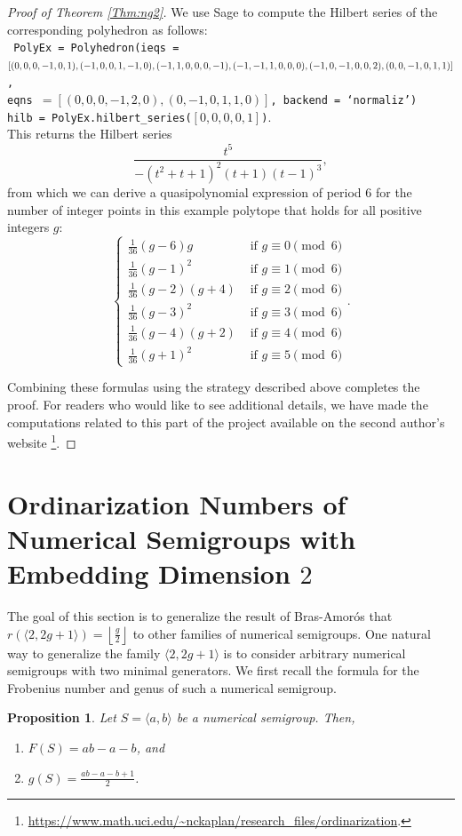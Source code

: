\documentclass[12pt]{amsart}
\theoremstyle{plain}\newtheorem{proposition}{Proposition}[section]
\begin{document}
\begin{proof}[Proof of Theorem \ref{Thm:ng2}]
We use Sage to compute the Hilbert series of the corresponding polyhedron as follows:\\
\texttt{\small{
PolyEx = Polyhedron(ieqs = $[(0,0,0,-1,0,1),(-1,0,0,1,-1,0),(-1,1,0,0,0,-1),\\
(-1,-1,1,0,0,0),(-1,0,-1,0,0,2),(0,0,-1,0,1,1)]$,\\
 eqns $= [(0,0,0,-1,2,0),(0,-1,0,1,1,0)]$, backend = `normaliz')\\
hilb = PolyEx.hilbert\_series($[0,0,0,0,1]$)}}.\\
This returns the Hilbert series 
 \[
\frac{t^5}{-{\left(t^{2} + t + 1\right)}^{2} {\left(t + 1\right)} {\left(t - 1\right)}^{3}},
 \]
from which we can derive a quasipolynomial expression of period $6$ for the number of integer points in this example polytope that holds for all positive integers $g$:
\[
\begin{cases}
\frac{1}{36} (g - 6)  g & \text{ if } g \equiv 0 \pmod{6} \\
\frac{1}{36}  (g - 1)^2  & \text{ if } g \equiv 1 \pmod{6} \\
\frac{1}{36} (g - 2)  (g+4) & \text{ if } g \equiv 2 \pmod{6} \\
\frac{1}{36}  (g - 3)^2  & \text{ if } g \equiv 3 \pmod{6} \\
\frac{1}{36} (g - 4)  (g+2) & \text{ if } g \equiv 4 \pmod{6} \\
\frac{1}{36}  (g + 1)^2  & \text{ if } g \equiv 5 \pmod{6} 
\end{cases}.
\]

Combining these formulas using the strategy described above completes the proof.  For readers who would like to see additional details, we have made the computations related to this part of the project available on the second author's website \footnote{\url{https://www.math.uci.edu/~nckaplan/research\_files/ordinarization}.}.
\end{proof}



\section{Ordinarization Numbers of Numerical Semigroups with Embedding Dimension $2$}\label{sec:ord_e2}

The goal of this section is to generalize the result of Bras-Amor\'os that $r\left(\langle 2,2g+1\rangle\right) = \left\lfloor\frac{g}{2}\right\rfloor$ to other families of numerical semigroups.  One natural way to generalize the family $\langle 2,2g+1\rangle$ is to consider arbitrary numerical semigroups with two minimal generators. We first recall the formula for the Frobenius number and genus of such a numerical semigroup.
\begin{proposition}\cite[Propositon 2.13]{GarciaSanchez_Rosales}\label{FG_2gen}
Let $S=\langle a,b\rangle$ be a numerical semigroup. Then,
\begin{enumerate}
\item $F(S) = ab-a-b$, and
\item $g(S) = \frac{ab-a-b+1}{2}$.
\end{enumerate}
\end{proposition}
\end{document}
